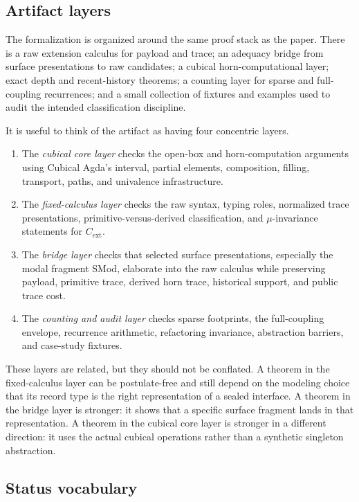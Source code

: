 \documentclass{lmcs}
\begin{document}
\subsection{Artifact layers}
\label{subsec:artifact-theorem-facing}

The formalization is organized around the same proof stack as the paper.  There is a raw
extension calculus for payload and trace; an adequacy bridge from surface presentations to raw
candidates; a cubical horn-computational layer; exact depth and recent-history theorems; a
counting layer for sparse and full-coupling recurrences; and a small collection of fixtures and
examples used to audit the intended classification discipline.

It is useful to think of the artifact as having four concentric layers.
\begin{enumerate}
\item The \emph{cubical core layer} checks the open-box and horn-computation arguments using
Cubical Agda's interval, partial elements, composition, filling, transport, paths, and
univalence infrastructure.
\item The \emph{fixed-calculus layer} checks the raw syntax, typing roles, normalized trace
presentations, primitive-versus-derived classification, and \(\mu\)-invariance statements for
\(C_{\mathrm{ext}}\).
\item The \emph{bridge layer} checks that selected surface presentations, especially the modal
fragment SMod, elaborate into the raw calculus while preserving payload, primitive trace,
derived horn trace, historical support, and public trace cost.
\item The \emph{counting and audit layer} checks sparse footprints, the full-coupling envelope,
recurrence arithmetic, refactoring invariance, abstraction barriers, and case-study fixtures.
\end{enumerate}
These layers are related, but they should not be conflated.  A theorem in the fixed-calculus
layer can be postulate-free and still depend on the modeling choice that its record type is the
right representation of a sealed interface.  A theorem in the bridge layer is stronger: it shows
that a specific surface fragment lands in that representation.  A theorem in the cubical core
layer is stronger in a different direction: it uses the actual cubical operations rather than a
synthetic singleton abstraction.

\subsection{Status vocabulary}
\label{subsec:status-vocabulary}
\end{document}
